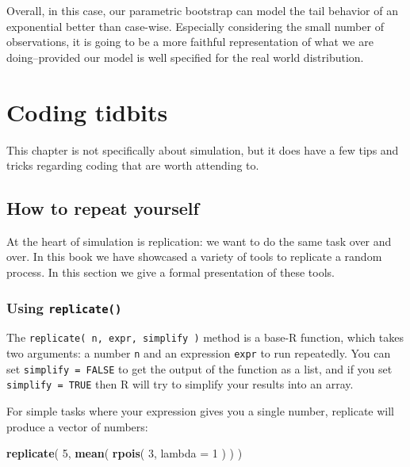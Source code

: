 \documentclass[
]{book}
\newenvironment{Shaded}{\begin{snugshade}}{\end{snugshade}}
\newcommand{\AttributeTok}[1]{\textcolor[rgb]{0.13,0.29,0.53}{#1}}
\newcommand{\DecValTok}[1]{\textcolor[rgb]{0.00,0.00,0.81}{#1}}
\newcommand{\FunctionTok}[1]{\textcolor[rgb]{0.13,0.29,0.53}{\textbf{#1}}}
\newcommand{\NormalTok}[1]{#1}
\begin{document}
Overall, in this case, our parametric bootstrap can model the tail behavior of an exponential better than case-wise.
Especially considering the small number of observations, it is going to be a more faithful representation of what we are doing--provided our model is well specified for the real world distribution.

\appendix


\chapter{Coding tidbits}\label{coding-tidbits}

This chapter is not specifically about simulation, but it does have a few tips and tricks regarding coding that are worth attending to.

\section{How to repeat yourself}\label{repeating-oneself}

At the heart of simulation is replication: we want to do the same task over and over. In this book we have showcased a variety of tools to replicate a random process. In this section we give a formal presentation of these tools.

\subsection{\texorpdfstring{Using \texttt{replicate()}}{Using replicate()}}\label{using-replicate}

The \texttt{replicate(\ n,\ expr,\ simplify\ )} method is a base-R function, which takes two arguments: a number \texttt{n} and an expression \texttt{expr} to run repeatedly. You can set \texttt{simplify\ =\ FALSE} to get the output of the function as a list, and if you set \texttt{simplify\ =\ TRUE} then R will try to simplify your results into an array.

For simple tasks where your expression gives you a single number, replicate will produce a vector of numbers:

\begin{Shaded}
\begin{Highlighting}[]
\FunctionTok{replicate}\NormalTok{( }\DecValTok{5}\NormalTok{, }\FunctionTok{mean}\NormalTok{( }\FunctionTok{rpois}\NormalTok{( }\DecValTok{3}\NormalTok{, }\AttributeTok{lambda =} \DecValTok{1}\NormalTok{ ) ) )}
\end{Highlighting}
\end{Shaded}
\end{document}
